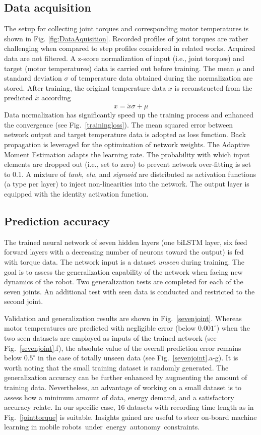 \documentclass{ifacconf}
\begin{document}
\subsection{Data acquisition}
The setup for collecting joint torques and corresponding motor temperatures is shown in Fig. \ref{fig:DataAquisition}. Recorded profiles of joint torques are rather challenging when compared to step profiles considered in related works.  Acquired data are not filtered. A z-score normalization of  input (i.e., joint torques) and target (motor temperatures) data is carried out before training. The  mean $\mu$ and standard deviation $\sigma$ of temperature data obtained during the normalization are stored. After training, the original temperature data $x$ is reconstructed from the predicted $\tilde{x}$ according
\begin{equation}
	x=\tilde{x}\sigma +\mu
\end{equation}
Data normalization has significantly speed up the training process and enhanced the convergence (see Fig.~\ref{trainingloss}). The mean squared error between network output and target temperature data  is adopted as loss function. Back propagation is leveraged for the optimization of network weights. The Adaptive Moment {Estimation adapts the learning rate.} The probability with which input elements are dropped out (i.e., set to zero) to prevent  network over-fitting is set to 0.1. A mixture of \textit{tanh}, \textit{elu}, and \textit{sigmoid} are distributed as activation functions (a type per layer) to inject non-linearities  into the network. The output layer is equipped {with the identity activation function.}
\subsection{Prediction accuracy}
The trained neural network of seven hidden layers (one biLSTM layer, six feed forward  layers with a decreasing number of neurons toward the output) is fed with torque data. The network input is a  dataset \textit{unseen} during training.  The goal is to  assess the generalization capability of the network when facing new dynamics of the robot. Two generalization tests are completed for each of the seven joints.  An additional test with seen data is conducted and restricted to the second joint.

Validation and generalization results are shown in Fig.~\ref{sevenjoint}. Whereas motor temperatures are predicted with negligible error (below $0.001^\circ$) when the two seen  datasets are employed as inputs of the trained network (see Fig.~\ref{sevenjoint}.f), the absolute value of the overall prediction error remains below $0.5^\circ$ in the case of totally unseen data (see  Fig.~\ref{sevenjoint}.a-g). It is worth noting that the small training dataset is randomly generated. The generalization accuracy can be further enhanced by augmenting the amount of training data. Nevertheless, an advantage of working on a small dataset is to assess how a minimum amount of data, energy demand, and a satisfactory accuracy relate. In our specific case, 16 datasets with recording time length as in Fig.~\ref{jointtorque} is suitable. Insights gained are useful to steer on-board machine learning in  mobile \mbox{robots under energy autonomy constraints.}
\end{document}
